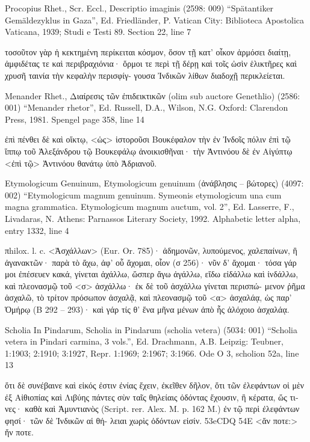 \documentclass[12pt,letterpaper,twoside,final]{memoir}
\begin{document}
\begin{greek}
Procopius Rhet., Scr. Eccl., Descriptio imaginis (2598: 009)
“Spätantiker Gemäldezyklus in Gaza”, Ed. Friedländer, P.
Vatican City: Biblioteca Apostolica Vaticana, 1939; Studi e Testi 89.
Section 22, line 7

τοσοῦτον γὰρ ἡ κεκτημένη περίκειται κόσμον, ὅσον τῇ κατ' οἶκον 
ἁρμόσει διαίτῃ, ἀμφιδέτας τε καὶ περιβραχιόνια· ὅρμοι τε περὶ τῇ 
δέρῃ καὶ τοῖς ὠσὶν ἑλικτῆρες καὶ χρυσῆ ταινία τὴν κεφαλὴν περισφίγ-
γουσα Ἰνδικῶν λίθων διαδοχῇ περικλείεται. 



Menander Rhet., Διαίρεσις τῶν ἐπιδεικτικῶν (olim sub auctore Genethlio) (2586: 001)
“Menander rhetor”, Ed. Russell, D.A., Wilson, N.G.
Oxford: Clarendon Press, 1981.
Spengel page 358, line 14

                         ἐπὶ πένθει δὲ καὶ οἴκτῳ, <ὡς> 
ἱστοροῦσι Βουκέφαλον τὴν ἐν Ἰνδοῖς πόλιν ἐπὶ τῷ 
ἵππῳ τοῦ Ἀλεξάνδρου τῷ Βουκεφάλῳ ἀνοικισθῆναι· 
τὴν Ἀντινόου δὲ ἐν Αἰγύπτῳ <ἐπὶ τῷ> Ἀντινόου θανάτῳ 
ὑπὸ Ἀδριανοῦ. 



Etymologicum Genuinum, Etymologicum genuinum (ἀνάβλησις – βώτορες) (4097: 002)
“Etymologicum magnum genuinum. Symeonis etymologicum una cum magna grammatica. Etymologicum magnum auctum, vol. 2”, Ed. Lasserre, F., Livadaras, N.
Athens: Parnassos Literary Society, 1992.
Alphabetic letter alpha, entry 1332, line 4

                         πhilox. l. c.   
 <Ἀσχάλλων> (Eur. Or. 785)· ἀδημονῶν, λυπούμενος, 
χαλεπαίνων, ἢ ἀγανακτῶν· παρὰ τὸ ἄχω, ἀφ' οὗ ἄχομαι, οἷον (σ 256)· 
  νῦν δ' ἄχομαι· τόσα γάρ μοι ἐπέσευεν κακά, 
γίνεται ἀχάλλω, ὥσπερ ἄγω ἀγάλλω, εἴδω εἰδάλλω καὶ ἰνδάλλω, καὶ 
πλεονασμῷ τοῦ <σ> ἀσχάλλω· ἐκ δὲ τοῦ ἀσχάλλω γίνεται περισπώ-
μενον ῥῆμα ἀσχαλῶ, τὸ τρίτον πρόσωπον ἀσχαλᾷ, καὶ πλεονασμῷ   
τοῦ <α> ἀσχαλάᾳ, ὡς παρ' Ὁμήρῳ (Β 292 – 293)· 
  καὶ γάρ τίς θ' ἕνα μῆνα μένων ἀπὸ ἧς ἀλόχοιο 
  ἀσχαλάᾳ. 



Scholia In Pindarum, Scholia in Pindarum (scholia vetera) (5034: 001)
“Scholia vetera in Pindari carmina, 3 vols.”, Ed. Drachmann, A.B.
Leipzig: Teubner, 1:1903; 2:1910; 3:1927, Repr. 1:1969; 2:1967; 3:1966.
Ode O 3, scholion 52a, line 13

               ὅτι δὲ συνέβαινε καὶ εἰκός ἐστιν ἐνίας ἔχειν, 
ἐκεῖθεν δῆλον, ὅτι τῶν ἐλεφάντων οἱ μὲν ἐξ Αἰθιοπίας καὶ 
Λιβύης πάντες σὺν ταῖς θηλείαις ὀδόντας ἔχουσιν, ἢ κέρατα, 
ὥς τινες· καθὰ καὶ Ἀμυντιανὸς (Script. rer. Alex. M. p. 162 
M.) ἐν τῷ περὶ ἐλεφάντων φησί· τῶν δὲ Ἰνδικῶν αἱ θή-
λειαι χωρὶς ὀδόντων εἰσίν. 53eCDQ 54E 
<ἅν ποτε:> ἥν ποτε. 




\end{greek}
\end{document}
